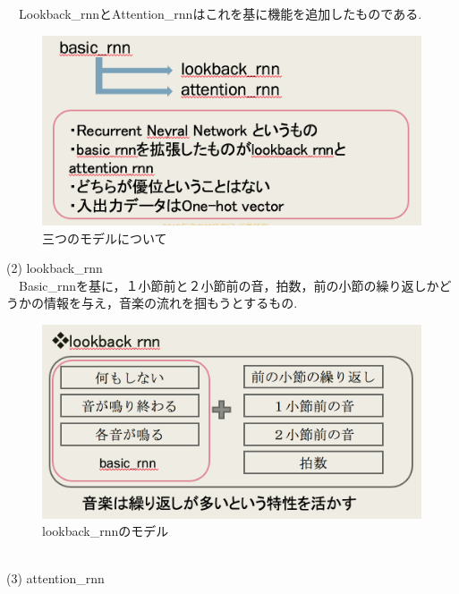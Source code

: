 　Lookback\_rnnとAttention\_rnnはこれを基に機能を追加したものである.
\begin{figure}[!ht]
    \begin{screen}
    \begin{center}
        \includegraphics[scale=0.8,clip]{./img/basic1.png}
        \caption{三つのモデルについて}
        \label{fig:Melody_RNNについて}
    \end{center}
    \end{screen}
\end{figure}
\newpage
(2) lookback\_rnn\\
　Basic\_rnnを基に，１小節前と２小節前の音，拍数，前の小節の繰り返しかどうかの情報を与え，音楽の流れを掴もうとするもの.
\begin{figure}[!ht]
    \begin{screen}
    \begin{center}
        \includegraphics[scale=0.8,clip]{./img/lookback1.png}
        \caption{lookback\_rnnのモデル}
        \label{fig:lookback_rnnのモデル}
    \end{center}
    \end{screen}
\end{figure}\\
\newpage
(3) attention\_rnn\\

